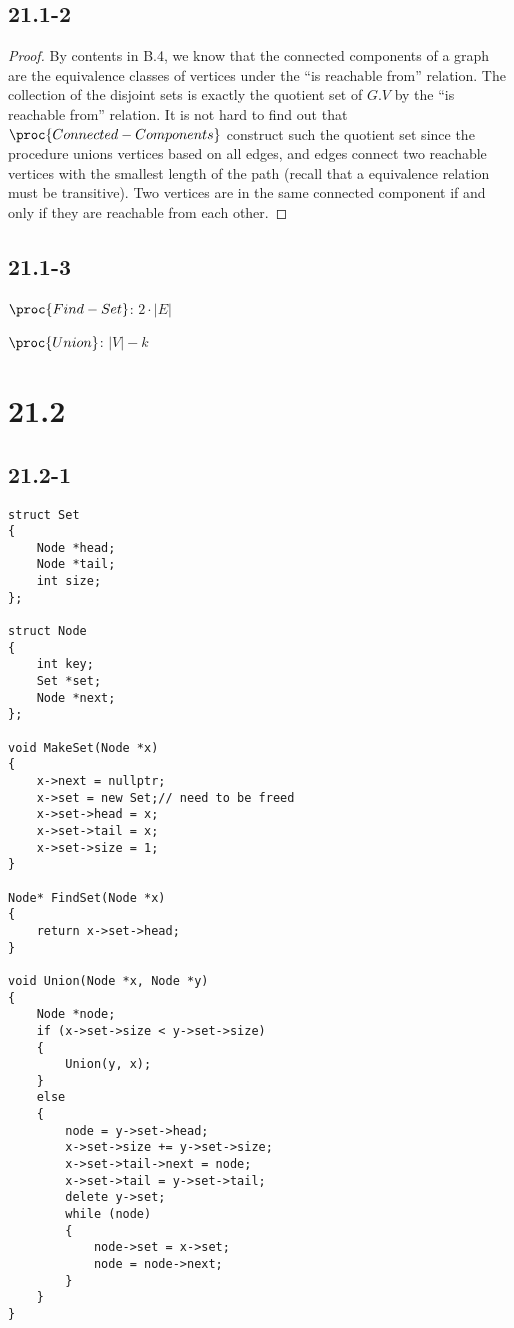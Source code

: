 \subsection*{21.1-2}

\begin{proof}
    By contents in B.4, we know that the connected components of a graph
    are the equivalence classes of vertices under the ``is reachable from'' relation.
    The collection of the disjoint sets is exactly 
    the quotient set of $G.V$ by the ``is reachable from'' relation.
    It is not hard to find out that $\proc{Connected-Components}$
    construct such the quotient set 
    since the procedure unions vertices based on all edges, 
    and edges connect two reachable vertices with the smallest length of the path
    (recall that a equivalence relation must be transitive).
    Two vertices are in the same connected component if and only if 
    they are reachable from each other.
\end{proof}

\subsection*{21.1-3}

$\proc{Find-Set}$: $2 \cdot |E|$

$\proc{Union}$: $|V| - k$

\section*{21.2}

\subsection*{21.2-1}

\begin{verbatim}
struct Set
{
    Node *head;
    Node *tail;
    int size;
};

struct Node
{
    int key;
    Set *set;
    Node *next;
};

void MakeSet(Node *x)
{
    x->next = nullptr;
    x->set = new Set;// need to be freed
    x->set->head = x;
    x->set->tail = x;
    x->set->size = 1;
}

Node* FindSet(Node *x)
{
    return x->set->head;
}

void Union(Node *x, Node *y)
{
    Node *node;
    if (x->set->size < y->set->size)
    {
        Union(y, x);
    }
    else
    {
        node = y->set->head;
        x->set->size += y->set->size;
        x->set->tail->next = node;
        x->set->tail = y->set->tail;
        delete y->set;
        while (node)
        {
            node->set = x->set;
            node = node->next;
        }
    }
}
\end{verbatim}

